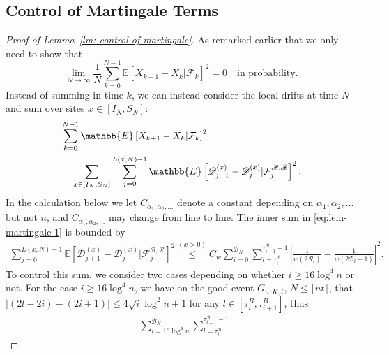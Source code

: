 \documentclass[EJP]{ejpecp} %
\begin{document}
\subsection{Control of Martingale Terms } 
\begin{proof}[Proof of Lemma~\ref{lm: control of martingale}]
	As remarked earlier that we only need to show that
	\[
	\lim_{N \to \infty } \frac{1}{N} \sum_{k = 0}^{N-1} \mathbb{E}\left[ X_{k+1} - X_k | \mathcal{F}_k \right]^2 = 0
	\quad \text{in probability}
	.\] 
	Instead of summing in time $k$, we can instead consider the local drifts at time $N$ and sum over sites $x \in [I_N, S_N]$:
	\begin{align}
		&\sum_{k = 0}^{N-1} \mathbb{E}\left[ X_{k+1} - X_k | \mathcal{F}_k \right]^2
		\notag
		\\
		&= \sum_{x \in \left[ I_N, S_N \right]} \sum_{j = 0}^{L(x, N) - 1} \mathbb{E}\left[ \mathscr{D}_{j+1}^{(x)} - \mathscr{D}_j^{(x)} | \mathcal{F}_{j}^{\mathscr{B}, \mathscr{R}} \right]^2  
		\label{eq:lem-martingale-1}
		.\end{align}
	In the calculation below we let $C_{\alpha_1, \alpha_2, \dots}$ denote a constant depending on  $\alpha_1, \alpha_2, \dots$ but not $n$, and $C_{\alpha_1, \alpha_2, \dots}$ may change from line to line.
	The inner sum in \eqref{eq:lem-martingale-1} is bounded by
	\begin{align*}
		\sum_{j =0}^{ L(x, N) - 1} \mathbb{E}\left[ \mathscr{D}_{j+1}^{(x)} - \mathscr{D}_j^{(x)} | \mathcal{F}_{j}^{\mathscr{B}, \mathscr{R}} \right]^2 \stackrel{(x > 0)}{\le} C_w \sum_{i = 0}^{\mathscr{B}_N} \sum_{l = \tau_i^{\mathscr{B}}}^{\tau_{i+1}^{\mathscr{B}}-1} 
		\left| \frac{1}{w(2 \mathscr{R}_l)} - \frac{1}{w\left( 2 \mathscr{B}_l + 1 \right) } \right|^2 
		.
	\end{align*}
	To control this sum, we consider two cases depending on whether $i \ge 16 \log^4 n$ or not. For the case $i \ge 16 \log^4 n$, we have on the good event $G_{n, K, t}$, $N \le \lfloor nt \rfloor$, that $|(2 l - 2 i) - (2 i + 1)| \leq 4 \sqrt{i} \log^2 n + 1$ for any $l \in [\tau_i^B, \tau_{i+1}^B]$, thus
	\begin{align*}
		&\sum_{i = 16 \log^4 n}^{\mathscr{B}_N} \sum_{l = \tau_i^{\mathscr{B}}}^{\tau_{i+1}^{\mathscr{B}}-1} 

\end{align*}
\end{proof}
\end{document}
